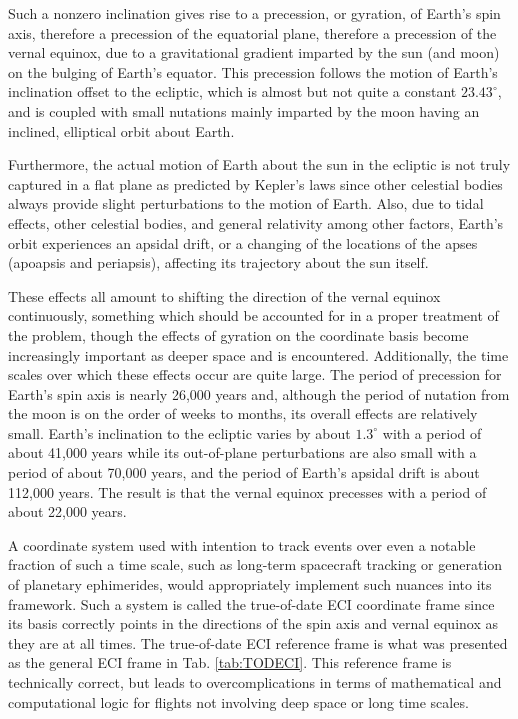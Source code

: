 \documentclass[11pt,dvipsnames]{thesis}
\begin{document}
Such a nonzero inclination gives rise to a precession, or gyration, of Earth's spin axis, therefore a precession of the equatorial plane, therefore a precession of the vernal equinox, due to a gravitational gradient imparted by the sun (and moon) on the bulging of Earth's equator. This precession follows the motion of Earth's inclination offset to the ecliptic, which is almost but not quite a constant $23.43^\circ$, and is coupled with small nutations mainly imparted by the moon having an inclined, elliptical orbit about Earth.

Furthermore, the actual motion of Earth about the sun in the ecliptic is not truly captured in a flat plane as predicted by Kepler's laws since other celestial bodies always provide slight perturbations to the motion of Earth. Also, due to tidal effects, other celestial bodies, and general relativity among other factors, Earth's orbit experiences an apsidal drift, or a changing of the locations of the apses (apoapsis and periapsis), affecting its trajectory about the sun itself.

These effects all amount to shifting the direction of the vernal equinox continuously, something which should be accounted for in a proper treatment of the problem, though the effects of gyration on the coordinate basis become increasingly important as deeper space and is encountered. Additionally, the time scales over which these effects occur are quite large. The period of precession for Earth's spin axis is nearly 26,000 years and, although the period of nutation from the moon is on the order of weeks to months, its overall effects are relatively small. Earth's inclination to the ecliptic varies by about $1.3^\circ$ with a period of about 41,000 years while its out-of-plane perturbations are also small with a period of about 70,000 years, and the period of Earth's apsidal drift is about 112,000 years. The result is that the vernal equinox precesses with a period of about 22,000 years.

A coordinate system used with intention to track events over even a notable fraction of such a time scale, such as long-term spacecraft tracking or generation of planetary ephimerides, would appropriately implement such nuances into its framework. Such a system is called the true-of-date ECI coordinate frame since its basis correctly points in the directions of the spin axis and vernal equinox as they are at all times. The true-of-date ECI reference frame is what was presented as the general ECI frame in Tab. \ref{tab:TODECI}. This reference frame is technically correct, but leads to overcomplications in terms of mathematical and computational logic for flights not involving deep space or long time scales.
\end{document}
